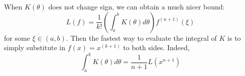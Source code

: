 \documentclass[../Main.tex]{subfiles}
\begin{document}
When $K(\theta)$ does not change sign, we can obtain a much nicer bound:
\begin{equation*}
    L(f) = \frac{1}{k!} \left(\int_{a}^{b} K(\theta) d\theta\right) f^{(n+1)}(\xi)
\end{equation*}
for some $\xi \in (a, b)$. Then the fastest way to evaluate the integral of $K$ is to simply substitute in $f(x) = x^{(k+1)}$ to both sides. Indeed,
\begin{equation*}
    \int_{a}^{b} K(\theta) d\theta = \frac{1}{n+1} L(x^{n+1})
\end{equation*}
\end{document}
